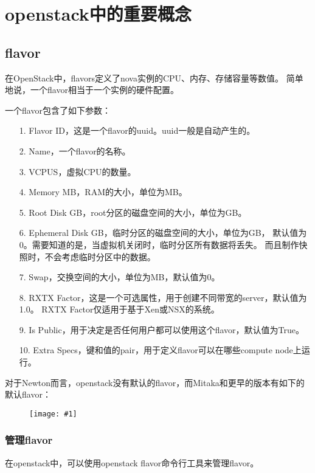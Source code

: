 \documentclass[a4paper,left=1.5cm,right=1.5cm,11pt]{article}
\newcommand{\fic}[1]{\begin{figure}[H]
		\center
		\texttt{[image: \#1]}
	\end{figure}}
\begin{document}
    
\section{openstack中的重要概念}
\subsection{flavor}
    在OpenStack中，flavors定义了nova实例的CPU、内存、存储容量等数值。
    简单地说，一个flavor相当于一个实例的硬件配置。\par

    一个flavor包含了如下参数：
    \begin{itemize}
        \item[1.] Flavor ID，这是一个flavor的uuid。uuid一般是自动产生的。
        \item[2.] Name，一个flavor的名称。
        \item[3.] VCPUS，虚拟CPU的数量。
        \item[4.] Memory MB，RAM的大小，单位为MB。
        \item[5.] Root Disk GB，root分区的磁盘空间的大小，单位为GB。
        \item[6.] Ephemeral Disk GB，临时分区的磁盘空间的大小，单位为GB，
                  默认值为0。需要知道的是，当虚拟机关闭时，临时分区所有数据将丢失。
                  而且制作快照时，不会考虑临时分区中的数据。
        \item[7.] Swap，交换空间的大小，单位为MB，默认值为0。
        \item[8.] RXTX Factor，这是一个可选属性，用于创建不同带宽的server，默认值为1.0。
                  RXTX Factor仅适用于基于Xen或NSX的系统。
        \item[9.] Is Public，用于决定是否任何用户都可以使用这个flavor，默认值为True。
        \item[10.] Extra Specs，键和值的pair，用于定义flavor可以在哪些compute node上运行。
    \end{itemize}

    对于Newton而言，openstack没有默认的flavor，而Mitaka和更早的版本有如下的默认flavor：
    \fic{1.png}

\subsubsection{管理flavor}
    在openstack中，可以使用openstack flavor命令行工具来管理flavor。\par
\end{document}
